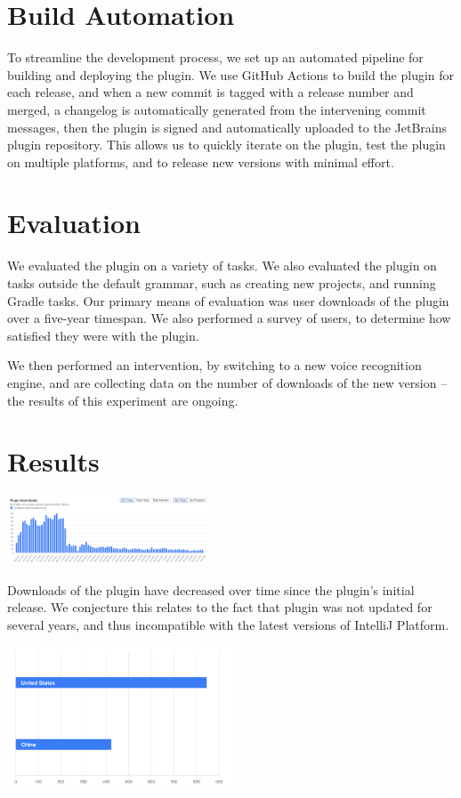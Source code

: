 \documentclass[conference]{IEEEtran}
\begin{document}
\section{Build Automation}

To streamline the development process, we set up an automated pipeline for building and deploying the plugin. We use GitHub Actions to build the plugin for each release, and when a new commit is tagged with a release number and merged, a changelog is automatically generated from the intervening commit messages, then the plugin is signed and automatically uploaded to the JetBrains plugin repository. This allows us to quickly iterate on the plugin, test the plugin on multiple platforms, and to release new versions with minimal effort.

\section{Evaluation}

We evaluated the plugin on a variety of tasks. We also evaluated the plugin on tasks outside the default grammar, such as creating new projects, and running Gradle tasks. Our primary means of evaluation was user downloads of the plugin over a five-year timespan. We also performed a survey of users, to determine how satisfied they were with the plugin.

We then performed an intervention, by switching to a new voice recognition engine, and are collecting data on the number of downloads of the new version -- the results of this experiment are ongoing.

\section{Results}

\includegraphics[width=0.45\textwidth]{downloads.png}

Downloads of the plugin have decreased over time since the plugin's initial release. We conjecture this relates to the fact that plugin was not updated for several years, and thus incompatible with the latest versions of IntelliJ Platform.

\includegraphics[width=0.50\textwidth]{demographics.png}
\end{document}
